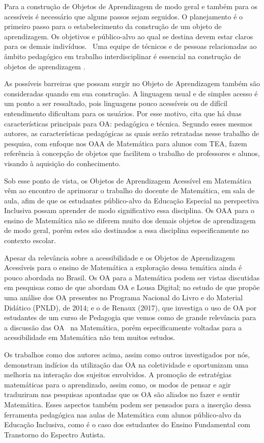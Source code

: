 \documentclass[portuguese]{textolivre}
\begin{document}
Para a construção de Objetos de Aprendizagem de modo geral e também para
os acessíveis é necessário que alguns passos sejam seguidos. O
planejamento é o primeiro passo para o estabelecimento da construção de
um objeto de aprendizagem. Os objetivos e público-alvo ao qual se
destina devem estar claros para os demais indivíduos.~ Uma equipe de
técnicos e de pessoas relacionadas ao âmbito pedagógico em trabalho
interdisciplinar é essencial na construção de objetos de aprendizagem
\cite{mourao2020}.

As possíveis barreiras que possam surgir no Objeto de Aprendizagem
também são consideradas quando em sua construção. A linguagem usual e de
simples acesso é um ponto a ser ressaltado, pois linguagens pouco
acessíveis ou de difícil entendimento dificultam para os usuários. Por
esse motivo, \textcite{souza2021} cita que há duas características principais
para OA: pedagógica e técnica. Segundo esses mesmos autores, as
características pedagógicas as quais serão retratadas nesse trabalho de
pesquisa, com enfoque nos OAA de Matemática para alunos com TEA, fazem
referência à concepção de objetos que facilitem o trabalho de
professores e alunos, visando à aquisição do conhecimento.

Sob esse ponto de vista, os Objetos de Aprendizagem Acessível em
Matemática vêm ao encontro de aprimorar o trabalho do docente de
Matemática, em sala de aula, afim de que os estudantes público-alvo da
Educação Especial na perspectiva Inclusiva possam aprender de modo
significativo essa disciplina. Os OAA para o ensino de Matemática não se
diferem muito dos demais objetos de aprendizagem de modo geral, porém
estes são destinados a essa disciplina especificamente no contexto
escolar.

Apesar da relevância sobre a acessibilidade e os Objetos de Aprendizagem
Acessíveis para o ensino de Matemática a exploração dessa temática ainda
é pouco abordada no Brasil. Os OA para a Matemática podem ser vistas
discutidas em pesquisas como de \textcite{derossi2015,capellini2015} que
abordam OA e Lousa Digital; no estudo de \textcite{kalinke2016} que propõe uma
análise dos OA presentes no Programa Nacional do Livro e do Material
Didático (PNLD), de 2014; e o de \textcite{renaux2017} Renaux (2017), que investiga o uso de
OA por estudantes de um curso de Pedagogia que vemos como de grande
relevância para a discussão das OA~ na Matemática, porém especificamente
voltadas para a acessibilidade em Matemática não tem muitos estudos.

Os trabalhos como dos autores acima, assim como outros investigados por
nós, demonstram indícios da utilização das OA na coletividade e
oportunizam uma melhoria na interação dos sujeitos envolvidos. A
promoção de estratégias matemáticas para o aprendizado, assim como, os
modos de pensar e agir traduziram nas pesquisas apontadas que os OA são
aliados no fazer e sentir Matemática. Esses aspectos também podem ser
pensados para a inserção dessa ferramenta pedagógica nas aulas de
Matemática com alunos público-alvo da Educação Inclusiva, como é o caso
dos estudantes do Ensino Fundamental com Transtorno do Espectro
Autista.~
\end{document}
